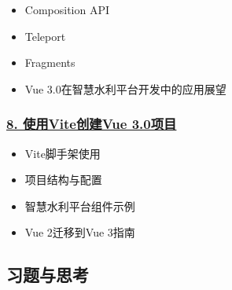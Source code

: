 \begin{itemize}
\tightlist
\item
  Composition API
\item
  Teleport
\item
  Fragments
\item
  Vue 3.0在智慧水利平台开发中的应用展望
\end{itemize}

\subsubsection{\texorpdfstring{\href{./section04-03-08.md}{8.
使用Vite创建Vue
3.0项目}}{8. 使用Vite创建Vue 3.0项目}}\label{ux4f7fux7528viteux521bux5efavue-3.0ux9879ux76ee}

\begin{itemize}
\tightlist
\item
  Vite脚手架使用
\item
  项目结构与配置
\item
  智慧水利平台组件示例
\item
  Vue 2迁移到Vue 3指南
\end{itemize}

\subsection{习题与思考}\label{ux4e60ux9898ux4e0eux601dux8003}

